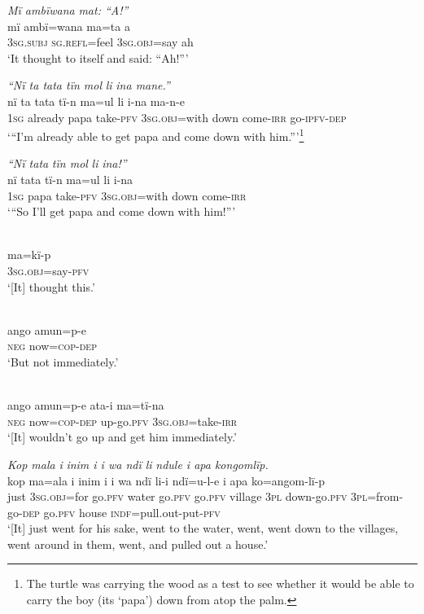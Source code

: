 \ex \textit{Mï ambï}{\textit{wana}} \textit{mat: “A!”}\\
\gll mï      ambï{=wana} ma{=}ta      a\\
3\textsc{sg.subj}  \textsc{sg.refl}=feel  3\textsc{sg.obj}=say  ah\\
\glt ‘It thought to itself and said: “Ah!”’

\ex \textit{“Nï ta tata tïn mol} {\textit{l}}\textit{i} {\textit{i}}\textit{na mane.”}\\
\gll nï    ta      tata    tï{{}-}n      m{a=u}l      {l}i    {i-}na ma{{}-}n{{}-}e\\
1\textsc{sg}  already    papa  take-\textsc{pfv}  3\textsc{sg.obj}=with  down  come-\textsc{irr} go-\textsc{ipfv-dep}\\
\glt ‘“{I’m already able to get papa and come down with him.”}’\footnote{The turtle was carrying the wood as a test to see whether it would be able to carry the boy (its ‘papa’) down from atop the palm.}

\ex \textit{“Nï ta}{\textit{ta}} \textit{tïn mol} {\textit{l}}\textit{i} {\textit{i}}\textit{na!”}\\
\gll nï    ta{ta} tï{{}-}n      m{a=u}l      {l}i    {i-}na\\
1\textsc{sg}  papa  take-\textsc{pfv}  3\textsc{sg.obj}=with  down  come-\textsc{irr}\\
\glt ‘“{So I’ll get papa and come down with him!”}’

\\
\gll ma{=}kï-p\\
3\textsc{sg.obj}=say-\textsc{pfv}\\
\glt ‘[It] thought this.’

\\
\gll ango  amun{=}p{{}-}e\\
\textsc{neg}  now=\textsc{cop}{}-\textsc{dep}\\
\glt ‘But not immediately.’

\\
\gll ango  amun{=}p{{}-}e    ata-i    ma=tï-na\\
\textsc{neg}  now=\textsc{cop}{}-\textsc{dep}  up-go.\textsc{pfv}  \textsc{3sg.obj}=take-\textsc{irr}\\
\glt ‘[It] wouldn’t go up and get him immediately.’

\newpage

\ex \textit{Kop mala} {\textit{i}} \textit{inim i i wa ndï li}{ \textit{ndule i apa kongomlïp.}}\\
\gll kop  ma=ala    {i} inim  i    i    wa    ndï  li-i ndï={u-}l{{}-}e      i    apa    ko=angom{{}-}lï-p\\
just    \textsc{3sg.obj=}for  go.\textsc{pfv}  water  go.\textsc{pfv}  go.\textsc{pfv}  village  3\textsc{pl}  down-go.\textsc{pfv} 3\textsc{pl}=from-go-\textsc{dep}  go.\textsc{pfv}  house  \textsc{indf}=pull.out-put-\textsc{pfv}\\
\glt ‘[It] just went for his sake, went to the water, went, went down to the villages, went around in them, {went,} and pulled out a house.’

